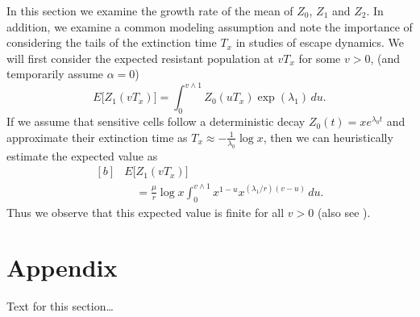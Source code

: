 \documentclass{bmcart}
\begin{document}
	In this section we examine the growth rate of the mean of $Z_0$, $Z_1$ and $Z_2$. In
	addition, we examine a common modeling assumption and note the
	importance of considering the tails of the extinction time $T_x$ in
	studies of escape dynamics.
	We will first consider the expected resistant population at $vT_x$ for
	some $v>0$, (and temporarily assume $\alpha=0$)
	\[
	E \bigl[Z_1(vT_x) \bigr]=
	\int_0^{v\wedge
		1}Z_0(uT_x)
	\exp (\lambda_1)\,du .
	\]
	If we assume that sensitive cells follow a deterministic decay
	$Z_0(t)=xe^{\lambda_0 t}$ and approximate their extinction time as
	$T_x\approx-\frac{1}{\lambda_0}\log x$, then we can heuristically
	estimate the expected value as
	\begin{equation}\label{eqexpmuts}
		\begin{aligned}[b]
			&      E\bigl[Z_1(vT_x)\bigr]\\
			&\quad      = \frac{\mu}{r}\log x
			\int_0^{v\wedge1}x^{1-u}x^{({\lambda_1}/{r})(v-u)}\,du .
		\end{aligned}
	\end{equation}
	Thus we observe that this expected value is finite for all $v>0$ (also see \cite{koon,xjon,marg,schn,koha,issnic}).
	
	
	\section*{Appendix}
	Text for this section\ldots
	
	
\end{document}
